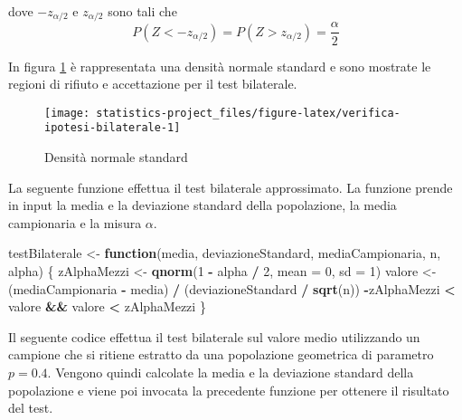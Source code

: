 \documentclass[]{book}
\newenvironment{Shaded}{\begin{snugshade}}{\end{snugshade}}
\newcommand{\KeywordTok}[1]{\textcolor[rgb]{0.13,0.29,0.53}{\textbf{#1}}}
\newcommand{\DataTypeTok}[1]{\textcolor[rgb]{0.13,0.29,0.53}{#1}}
\newcommand{\DecValTok}[1]{\textcolor[rgb]{0.00,0.00,0.81}{#1}}
\newcommand{\StringTok}[1]{\textcolor[rgb]{0.31,0.60,0.02}{#1}}
\newcommand{\ControlFlowTok}[1]{\textcolor[rgb]{0.13,0.29,0.53}{\textbf{#1}}}
\newcommand{\OperatorTok}[1]{\textcolor[rgb]{0.81,0.36,0.00}{\textbf{#1}}}
\newcommand{\NormalTok}[1]{#1}
\begin{document}
dove \(-z_{\alpha/2}\) e \(z_{\alpha/2}\) sono tali che
\[P(Z < -z_{\alpha/2}) = P(Z > z_{\alpha/2}) = \frac{\alpha}{2}\]

In figura \ref{fig:verifica-ipotesi-bilaterale} è rappresentata una
densità normale standard e sono mostrate le regioni di rifiuto e
accettazione per il test bilaterale.

\begin{figure}

{\centering \texttt{[image: statistics-project\_files/figure-latex/verifica-ipotesi-bilaterale-1]} 

}

\caption{Densità normale standard}\label{fig:verifica-ipotesi-bilaterale}
\end{figure}

La seguente funzione effettua il test bilaterale approssimato. La
funzione prende in input la media e la deviazione standard della
popolazione, la media campionaria e la misura \(\alpha\).

\begin{Shaded}
\begin{Highlighting}[]
\NormalTok{testBilaterale <-}\StringTok{ }\ControlFlowTok{function}\NormalTok{(media, deviazioneStandard, mediaCampionaria, n, alpha) \{}
\NormalTok{  zAlphaMezzi <-}\StringTok{ }\KeywordTok{qnorm}\NormalTok{(}\DecValTok{1} \OperatorTok{-}\StringTok{ }\NormalTok{alpha }\OperatorTok{/}\StringTok{ }\DecValTok{2}\NormalTok{, }\DataTypeTok{mean =} \DecValTok{0}\NormalTok{, }\DataTypeTok{sd =} \DecValTok{1}\NormalTok{)}
\NormalTok{  valore <-}\StringTok{ }\NormalTok{(mediaCampionaria }\OperatorTok{-}\StringTok{ }\NormalTok{media) }\OperatorTok{/}\StringTok{ }\NormalTok{(deviazioneStandard }\OperatorTok{/}\StringTok{ }\KeywordTok{sqrt}\NormalTok{(n))}
  \OperatorTok{-}\NormalTok{zAlphaMezzi }\OperatorTok{<}\StringTok{ }\NormalTok{valore }\OperatorTok{&&}\StringTok{ }\NormalTok{valore }\OperatorTok{<}\StringTok{ }\NormalTok{zAlphaMezzi}
\NormalTok{\}}
\end{Highlighting}
\end{Shaded}

Il seguente codice effettua il test bilaterale sul valore medio
utilizzando un campione che si ritiene estratto da una popolazione
geometrica di parametro \(p = 0.4\). Vengono quindi calcolate la media e
la deviazione standard della popolazione e viene poi invocata la
precedente funzione per ottenere il risultato del test.
\end{document}
